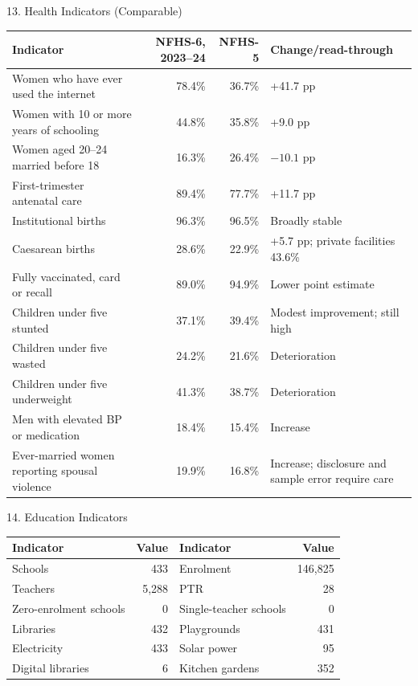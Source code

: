 \documentclass[aspectratio=169,11pt]{beamer}
\renewcommand{\arraystretch}{1.12}
\newcommand{\smalltable}{\scriptsize\setlength{\tabcolsep}{2.5pt}\renewcommand{\arraystretch}{1.08}}
\begin{document}
\begin{frame}{13. Health Indicators (Comparable)}\tiny\setlength{\tabcolsep}{2pt}\renewcommand{\arraystretch}{1.08}
\begin{tabularx}{\textwidth}{p{}rrY}\toprule Indicator & NFHS-6, 2023--24 & NFHS-5 & Change/read-through\\\midrule
Women who have ever used the internet & 78.4\% & 36.7\% & +41.7 pp\\ Women with 10 or more years of schooling & 44.8\% & 35.8\% & +9.0 pp\\ Women aged 20--24 married before 18 & 16.3\% & 26.4\% & $-10.1$ pp\\ First-trimester antenatal care & 89.4\% & 77.7\% & +11.7 pp\\ Institutional births & 96.3\% & 96.5\% & Broadly stable\\ Caesarean births & 28.6\% & 22.9\% & +5.7 pp; private facilities 43.6\%\\ Fully vaccinated, card or recall & 89.0\% & 94.9\% & Lower point estimate\\ Children under five stunted & 37.1\% & 39.4\% & Modest improvement; still high\\ Children under five wasted & 24.2\% & 21.6\% & Deterioration\\ Children under five underweight & 41.3\% & 38.7\% & Deterioration\\ Men with elevated BP or medication & 18.4\% & 15.4\% & Increase\\ Ever-married women reporting spousal violence & 19.9\% & 16.8\% & Increase; disclosure and sample error require care\\\bottomrule\end{tabularx}
\end{frame}

\begin{frame}{14. Education Indicators}\smalltable
\begin{tabularx}{\textwidth}{p{}r p{}r}\toprule Indicator & Value & Indicator & Value\\\midrule
Schools & 433 & Enrolment & 146,825\\ Teachers & 5,288 & PTR & 28\\ Zero-enrolment schools & 0 & Single-teacher schools & 0\\ Libraries & 432 & Playgrounds & 431\\ Electricity & 433 & Solar power & 95\\ Digital libraries & 6 & Kitchen gardens & 352\\\bottomrule\end{tabularx}
\end{frame}
\end{document}
